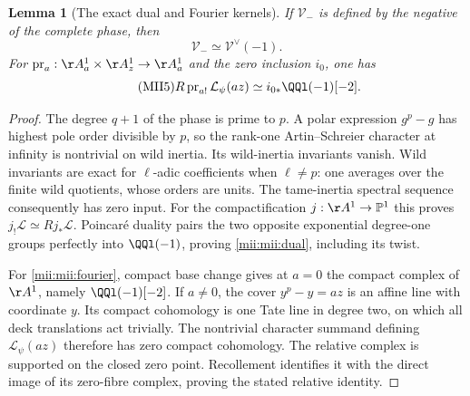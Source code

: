 \documentclass[11pt,a4paper]{article}
\newtheorem{lemma}[theorem]{Lemma}
\begin{document}
\begin{lemma}[The exact dual and Fourier kernels]\label{mii:mii:fourierlemma}
If $\mathcal V_-$ is defined by the negative of the complete phase, then
\begin{equation}\tag{MII4}\label{mii:mii:dual}
 \mathcal V_-\simeq\mathcal V^\vee(-1).
\end{equation}
For $\operatorname{pr}_a:\AA_a^1\times\AA_z^1\to\AA_a^1$ and the zero
inclusion $i_0$, one has
\begin{equation}\tag{MII5}\label{mii:mii:fourier}
 R\operatorname{pr}_{a!}\mathcal L_\psi(az)
       \simeq i_{0*}\QQl(-1)[-2].
\end{equation}
\end{lemma}
\begin{proof}
The degree $q+1$ of the phase is prime to $p$. A polar expression $g^p-g$
has highest pole order divisible by $p$, so the rank-one Artin--Schreier
character at infinity is nontrivial on wild inertia. Its wild-inertia
invariants vanish. Wild invariants are exact for $\ell$-adic coefficients
when $\ell\ne p$: one averages over the finite wild quotients, whose orders
are units. The tame-inertia spectral sequence consequently has zero input.
For the compactification $j:\AA^1\to\mathbb P^1$ this proves
$j_!\mathcal L\simeq Rj_*\mathcal L$. Poincar\'e duality pairs the two
opposite exponential degree-one groups perfectly into $\QQl(-1)$, proving
\eqref{mii:mii:dual}, including its twist.

For \eqref{mii:mii:fourier}, compact base change gives at $a=0$ the compact
complex of $\AA^1$, namely $\QQl(-1)[-2]$. If $a\ne0$, the cover
$y^p-y=az$ is an affine line with coordinate $y$. Its compact cohomology is
one Tate line in degree two, on which all deck translations act trivially.
The nontrivial character summand defining $\mathcal L_\psi(az)$ therefore
has zero compact cohomology. The relative complex is supported on the
closed zero point. Recollement identifies it with the direct image of its
zero-fibre complex, proving the stated relative identity.
\end{proof}
\end{document}
